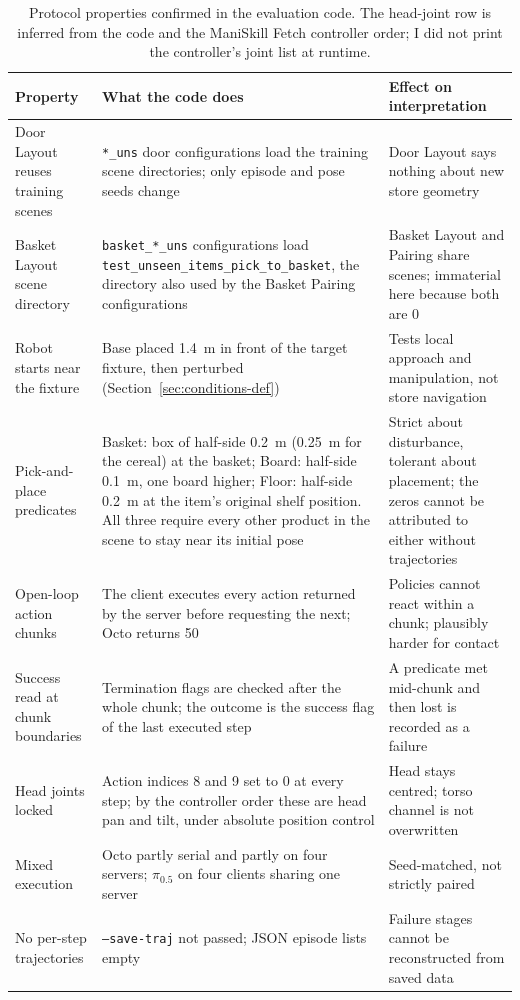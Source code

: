 {\renewcommand{\arraystretch}{1.2}
\begin{table}[H]
\centering
\footnotesize
\begin{tabularx}{\textwidth}{
>{\RaggedRight\arraybackslash}p{}
>{\RaggedRight\arraybackslash}X
>{\RaggedRight\arraybackslash}p{}}
\toprule
Property & What the code does & Effect on interpretation \\
\midrule
Door Layout reuses training scenes & \texttt{*\_uns} door configurations load the training scene directories; only episode and pose seeds change & Door Layout says nothing about new store geometry \\
Basket Layout scene directory & \texttt{basket\_*\_uns} configurations load \texttt{test\_unseen\_items\_pick\_to\_basket}, the directory also used by the Basket Pairing configurations & Basket Layout and Pairing share scenes; immaterial here because both are 0 \\
Robot starts near the fixture & Base placed 1.4~m in front of the target fixture, then perturbed (Section~\ref{sec:conditions-def}) & Tests local approach and manipulation, not store navigation \\
Pick-and-place predicates & Basket: box of half-side 0.2~m (0.25~m for the cereal) at the basket; Board: half-side 0.1~m, one board higher; Floor: half-side 0.2~m at the item's original shelf position. All three require every other product in the scene to stay near its initial pose & Strict about disturbance, tolerant about placement; the zeros cannot be attributed to either without trajectories \\
Open-loop action chunks & The client executes every action returned by the server before requesting the next; Octo returns 50 & Policies cannot react within a chunk; plausibly harder for contact \\
Success read at chunk boundaries & Termination flags are checked after the whole chunk; the outcome is the success flag of the last executed step & A predicate met mid-chunk and then lost is recorded as a failure \\
Head joints locked & Action indices 8 and 9 set to 0 at every step; by the controller order these are head pan and tilt, under absolute position control & Head stays centred; torso channel is not overwritten \\
Mixed execution & Octo partly serial and partly on four servers; $\pi_{0.5}$ on four clients sharing one server & Seed-matched, not strictly paired \\
No per-step trajectories & \texttt{--save-traj} not passed; JSON episode lists empty & Failure stages cannot be reconstructed from saved data \\
\bottomrule
\end{tabularx}
\caption{Protocol properties confirmed in the evaluation code. The head-joint row is inferred from the code and the ManiSkill Fetch controller order; I did not print the controller's joint list at runtime.}
\label{tab:protocol-properties}
\end{table}}

